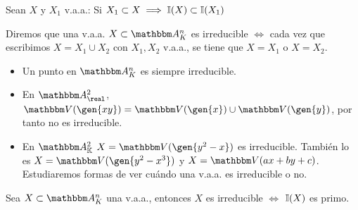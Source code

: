 \obs Sean $X$ y $X_1$ v.a.a.: Si $X_1 \subset X \implies \mathbb{I}(X) \subset \mathbb{I}(X_1)$

\begin{defn}[v.a.a. irreducible]
	Diremos que una v.a.a. $X \subset \A^n_K$ es irreducible $\Leftrightarrow$ cada vez que escribimos $X=X_1 \cup X_2$ con $X_1, X_2$ v.a.a., se tiene que $X=X_1$ o $X=X_2$.
\end{defn}

\begin{example}
	\begin{itemize}
	\item Un punto en $\A_K^n$ es siempre irreducible.
	\item En $\A^2_{\real}$, $\V(\gen{xy})=\V(\gen{x}) \cup \V(\gen{y})$, por tanto no es irreducible.
	\item En $\A^2_{\K}$ $X=\V(\gen{y^2-x})$ es irreducible. También lo es $X=\V(\gen{y^2-x^3})$ y $X=\V(ax+by+c)$. Estudiaremos formas de ver cuándo una v.a.a. es irreducible o no.
	\end{itemize}
\end{example}

\begin{prop}
	Sea $X \subset \A_K^n$ una v.a.a., entonces $X$ es irreducible $\Leftrightarrow$ $\mathbb{I}(X)$ es primo.
\end{prop}

